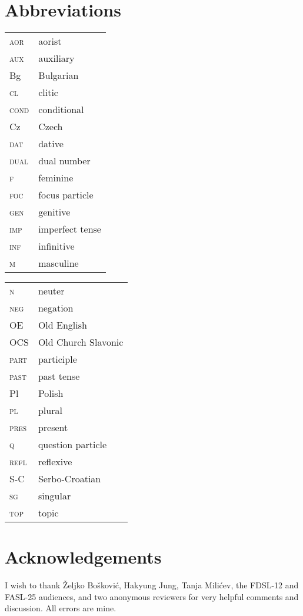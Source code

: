 \documentclass[output=paper,modfonts,newtxmath,hidelinks]{langscibook}
\begin{document}
\section*{Abbreviations}

\begin{tabularx}{.5\textwidth}{@{}lQ@{}}
\textsc{aor}&aorist\\
\textsc{aux}&auxiliary\\
Bg&{Bulgarian}\\
\textsc{cl}&{clitic}\\
\textsc{cond}&conditional\\
Cz&{Czech}\\
\textsc{dat}&{dative}\\ 
\textsc{dual}&dual number\\
\textsc{f}&{feminine}\\
\textsc{foc}&focus particle\\
\textsc{gen}&{genitive}\\
\textsc{imp}&imperfect tense\\
\textsc{inf}&{infinitive}\\
\textsc{m}&{masculine}\\
\end{tabularx}%
\begin{tabularx}{.5\textwidth}{@{}lQ@{}}
\textsc{n}&{neuter}\\
\textsc{neg}&{negation}\\
OE&Old {English}\\
OCS&Old Church {Slavonic}\\
\textsc{part}&{participle}\\
\textsc{past}&{past tense}\\
Pl&{Polish}\\
\textsc{pl}&{plural}\\
\textsc{pres}&present\\
\textsc{q}&question particle\\
\textsc{refl}&reflexive\\
S-C&Serbo-{Croatian}\\
\textsc{sg}&singular\\
\textsc{top}&topic\\
\end{tabularx}

\section*{Acknowledgements}

I wish to thank Željko Bošković, Hakyung Jung, Tanja Milićev, the FDSL-12 and FASL-25 audiences, and two anonymous reviewers for very helpful comments and discussion. All errors are mine.

\sloppy
\printbibliography[heading=subbibliography,notkeyword=this]
\end{document}
